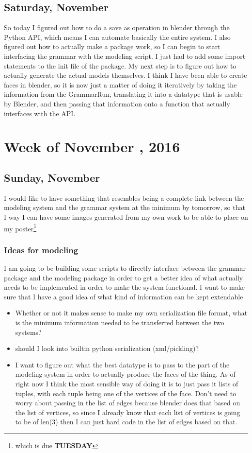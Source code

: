 \documentclass[letterpaper,oneside,titlepage]{article}
\begin{document}
\subsection{Saturday, November }
So today I figured out how to do a save as operation in blender through the Python API, which means I can automate basically the entire system.  I also figured out how to actually make a package work, so I can begin to start interfacing the grammar with the modeling script.  I just had to add some import statements to the init file of the package.  My next step is to figure out how to actually generate the actual models themselves.  I think I have been able to create faces in blender, so it is now just a matter of doing it iteratively by taking the information from the GrammarRun, translating it into a datatype that is usable by Blender, and then passing that information onto a function that actually interfaces with the API.


\section{Week of November , 2016}


\subsection{Sunday, November }
I would like to have something that resembles being a complete link between the modeling system and the grammar system at the minimum by tomorrow, so that I way I can have some images generated from my own work to be able to place on my poster\footnote{which is due \textbf{TUESDAY}}

\subsubsection{Ideas for modeling}
I am going to be building some scripts to directly interface between the grammar package and the modeling package in order to get a better idea of what actually needs to be implemented in order to make the system functional.  I want to make sure that I have a good idea of what kind of information can be kept extendable
\begin{itemize}
\item Whether or not it makes sense to make my own serialization file format, what is the minimum information needed to be transferred between the two systems?
\item should I look into builtin python serialization (xml/pickling)?
\item I want to figure out what the best datatype is to pass to the part of the modeling system in order to actually produce the faces of the thing.  As of right now I think the most sensible way of doing it is to just pass it lists of tuples, with each tuple being one of the vertices of the face.  Don't need to worry about passing in the list of edges because blender does that based on the list of vertices, so since I already know that each list of vertices is going to be of len(3) then I can just hard code in the list of edges based on that.
\end{itemize}
\end{document}
